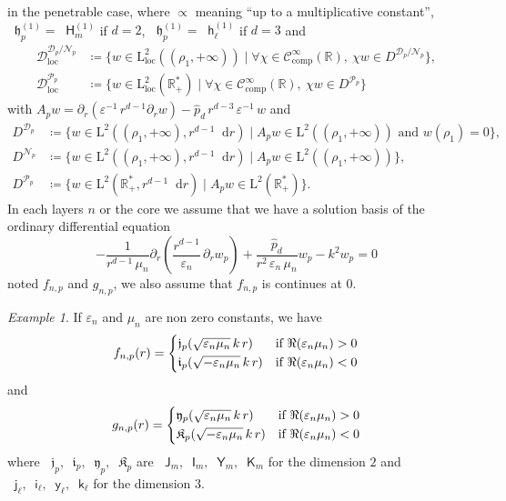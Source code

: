 \documentclass[12pt,a4paper]{article}
\theoremstyle{definition}
\theoremstyle{plain}
\theoremstyle{remark}
\newtheorem{example}[definition]{Example}
\newcommand{\bbR}{\mathbb{R}}
\newcommand{\calD}{\mathcal{D}}
\newcommand{\calN}{\mathcal{N}}
\newcommand{\calP}{\mathcal{P}}
\newcommand{\scrC}{\mathscr{C}}
\newcommand{\rmL}{\mathrm{L}}
\newcommand{\bJ}{\mathop{}\!\mathsf{J}}
\newcommand{\bY}{\mathop{}\!\mathsf{Y}}
\newcommand{\Hu}{\mathop{}\!\mathsf{H}^{(1)}}
\newcommand{\bI}{\mathop{}\!\mathsf{I}}
\newcommand{\bK}{\mathop{}\!\mathsf{K}}
\newcommand{\bj}{\mathop{}\!\mathsf{j}}
\newcommand{\by}{\mathop{}\!\mathsf{y}}
\newcommand{\hu}{\mathop{}\!\mathsf{h}^{(1)}}
\newcommand{\bi}{\mathop{}\!\mathsf{i}}
\newcommand{\bk}{\mathop{}\!\mathsf{k}}
\newcommand{\frj}{\mathop{}\!\mathfrak{j}}
\newcommand{\fry}{\mathop{}\!\mathfrak{y}}
\newcommand{\frh}{\mathop{}\!\mathfrak{h}^{(1)}}
\newcommand{\fri}{\mathop{}\!\mathfrak{i}}
\newcommand{\frk}{\mathop{}\!\mathfrak{K}}
\newcommand{\di}[1]{\mathop{}\!\mathrm{d}#1}
\newcommand{\plr}[1]{\left(#1\right)}
\newcommand{\eps}{\varepsilon}
\newcommand{\comp}{\mathrm{comp}}
\newcommand{\loc}{\mathrm{loc}}
\begin{document}
in the penetrable case, where $\propto$ meaning ``up to a multiplicative constant'', $\frh_p = \Hu_m$ if $d = 2$, $\frh_p = \hu_\ell$ if $d = 3$ and
\begin{align*}
    \calD^{\calD_p/\calN_p}_\loc & \coloneqq \{w \in \rmL_\loc^2((\rho_1, +\infty)) \mid \forall \chi \in \scrC_\comp^\infty(\bbR),\ \chi w \in D^{\calD_p/\calN_p}\}, \\
    \calD^{\calP_p}_\loc         & \coloneqq \{w \in \rmL_\loc^2(\bbR_+^*) \mid \forall \chi \in \scrC_\comp^\infty(\bbR),\ \chi w \in D^{\calP_p}\}
\end{align*}
with $A_p w =  \partial_r(\eps^{-1}\, r^{d-1} \partial_r w) - \widehat{p}_d\, r^{d-3}\, \eps^{-1}\, w$ and
\begin{align*}
    D^{\calD_p} & \coloneqq \{w \in \rmL^2((\rho_1, +\infty), r^{d-1}\di{r}) \mid A_p w \in \rmL^2((\rho_1, +\infty)) \text{ and } w(\rho_1) = 0\}, \\
    D^{\calN_p} & \coloneqq \{w \in \rmL^2((\rho_1, +\infty), r^{d-1}\di{r}) \mid A_p w \in \rmL^2((\rho_1, +\infty))\},                            \\
    D^{\calP_p} & \coloneqq \{w \in \rmL^2(\bbR_+^*, r^{d-1}\di{r}) \mid A_p w  \in \rmL^2(\bbR_+^*)\}.
\end{align*}
In each layers $n$ or the core we assume that we have a solution basis of the ordinary differential equation
\[
    -\frac{1}{r^{d-1}\, \mu_n} \partial_r\plr{\frac{r^{d-1}}{\eps_n}\, \partial_r w_p} + \dfrac{\widehat{p}_d}{r^2\, \eps_n\, \mu_n} w_p - k^2 w_p = 0
\]
noted $f_{n, p}$ and $g_{n, p}$, we also assume that $f_{n, p}$ is continues at $0$.

\begin{example}
    If $\eps_n$ and $\mu_n$ are non zero constants, we have
    \[
        f_{n, p}(r) = \begin{dcases}
            \frj_p(\sqrt{\eps_n\mu_n}\, k\, r)  & \text{if } \Re(\eps_n\mu_n) > 0 \\
            \fri_p(\sqrt{-\eps_n\mu_n}\, k\, r) & \text{if } \Re(\eps_n\mu_n) < 0
        \end{dcases}
    \]
    and
    \[
        g_{n, p}(r) = \begin{dcases}
            \fry_p(\sqrt{\eps_n\mu_n}\, k\, r)  & \text{if } \Re(\eps_n\mu_n) > 0 \\
            \frk_p(\sqrt{-\eps_n\mu_n}\, k\, r) & \text{if } \Re(\eps_n\mu_n) < 0
        \end{dcases}
    \]
    where $\frj_p, \fri_p, \fry_p, \frk_p$ are $\bJ_m, \bI_m, \bY_m, \bK_m$ for the dimension $2$ and $\bj_\ell, \bi_\ell, \by_\ell, \bk_\ell$ for the dimension $3$.
\end{example}
\end{document}
